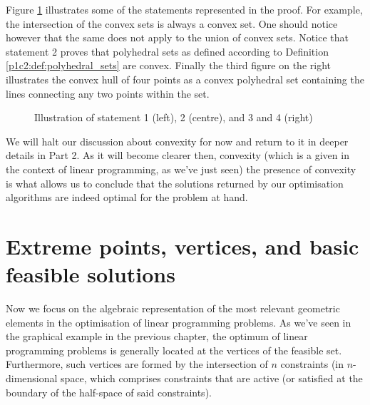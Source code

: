 Figure \ref{p1c2:fig:convexity_theorem_examples} illustrates some of the statements represented in the proof. For example, the intersection of the convex sets is always a convex set. One should notice however that the same does not apply to the union of convex sets. Notice that statement 2 proves that polyhedral sets as defined according to Definition \ref{p1c2:def:polyhedral_sets} are convex. Finally the third figure on the right illustrates the convex hull of four points as a convex polyhedral set containing the lines connecting any two points within the set. 
 
\begin{figure}
    \vspace{-6pt}
	\caption{Illustration of statement 1 (left), 2 (centre), and 3 and 4 (right)} \label{p1c2:fig:convexity_theorem_examples}
\end{figure}	

We will halt our discussion about convexity for now and return to it in deeper details in Part 2. As it will become clearer then, convexity (which is a given in the context of linear programming, as we've just seen) the presence of convexity is what allows us to conclude that the solutions returned by our optimisation algorithms are indeed optimal for the problem at hand. 


\section{Extreme points, vertices, and basic feasible solutions}

Now we focus on the algebraic representation of the most relevant geometric elements in the optimisation of linear programming problems. As we've seen in the graphical example in the previous chapter, the optimum of linear programming problems is generally located at the vertices of the feasible set. Furthermore, such vertices are formed by the intersection of $n$ constraints (in $n$-dimensional space, which comprises constraints that are active (or satisfied at the boundary of the half-space of said constraints).

